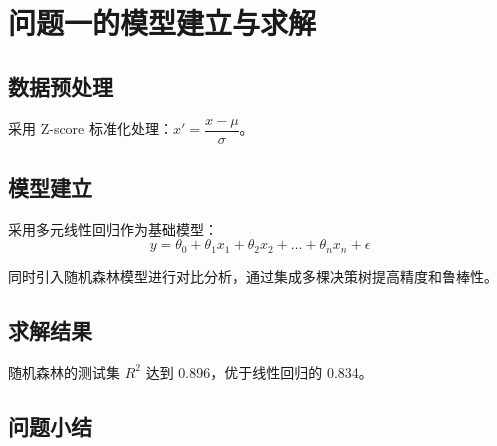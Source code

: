 \section{问题一的模型建立与求解}

\subsection{数据预处理}

采用 Z-score 标准化处理：$x' = \dfrac{x - \mu}{\sigma}$。

\subsection{模型建立}

采用多元线性回归作为基础模型：
\[
  y = \theta_0 + \theta_1 x_1 + \theta_2 x_2 + \dots + \theta_n x_n + \epsilon
\]

同时引入随机森林模型进行对比分析，通过集成多棵决策树提高精度和鲁棒性。

\subsection{求解结果}

随机森林的测试集 $R^2$ 达到 0.896，优于线性回归的 0.834。

\subsection{问题小结}

